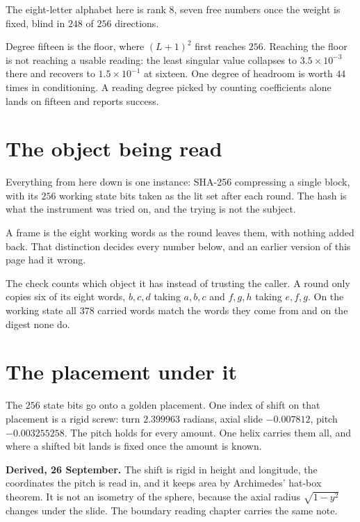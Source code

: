 The eight-letter alphabet here is rank \(8\), seven free numbers once the weight is fixed, blind in \(248\) of \(256\) directions.

Degree fifteen is the floor, where \((L+1)^2\) first reaches \(256\). Reaching the floor is not reaching a usable reading: the least singular value collapses to \(3.5 \times 10^{-3}\) there and recovers to \(1.5 \times 10^{-1}\) at sixteen. One degree of headroom is worth \(44\) times in conditioning. A reading degree picked by counting coefficients alone lands on fifteen and reports success.

\section{The object being read}

Everything from here down is one instance: SHA-256 compressing a single block, with its \(256\) working state bits taken as the lit set after each round. The hash is what the instrument was tried on, and the trying is not the subject.

A frame is the eight working words as the round leaves them, with nothing added back. That distinction decides every number below, and an earlier version of this page had it wrong.

The check counts which object it has instead of trusting the caller. A round only copies six of its eight words, \(b,c,d\) taking \(a,b,c\) and \(f,g,h\) taking \(e,f,g\). On the working state all \(378\) carried words match the words they come from and on the digest none do.

\section{The placement under it}

The \(256\) state bits go onto a golden placement. One index of shift on that placement is a rigid screw: turn \(2.399963\) radians, axial slide \(-0.007812\), pitch \(-0.003255258\). The pitch holds for every amount. One helix carries them all, and where a shifted bit lands is fixed once the amount is known.

\textbf{Derived, 26 September.} The shift is rigid in height and longitude, the coordinates the pitch is read in, and it keeps area by Archimedes' hat-box theorem. It is not an isometry of the sphere, because the axial radius \(\sqrt{1 - y^2}\) changes under the slide. The boundary reading chapter carries the same note.

